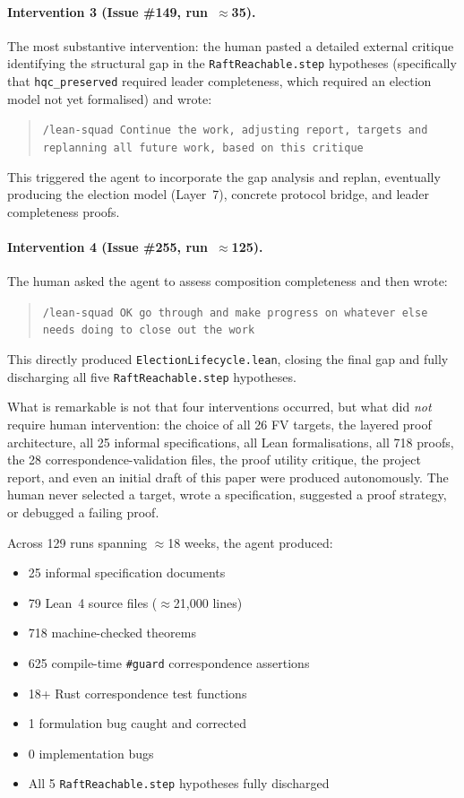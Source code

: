 \documentclass[sigconf,10pt]{acmart}
\begin{document}
\paragraph{Intervention 3 (Issue \#149, run~$\approx$35).}
The most substantive intervention: the human pasted a detailed
external critique identifying the structural gap in the
\texttt{RaftReachable.step} hypotheses (specifically that
\texttt{hqc\_preserved} required leader completeness, which
required an election model not yet formalised) and wrote:
\begin{quote}\small
\texttt{/lean-squad Continue the work, adjusting report, targets
and replanning all future work, based on this critique}
\end{quote}
This triggered the agent to incorporate the gap analysis and
replan, eventually producing the election model (Layer~7),
concrete protocol bridge, and leader completeness proofs.

\paragraph{Intervention 4 (Issue \#255, run~$\approx$125).}
The human asked the agent to assess composition completeness
and then wrote:
\begin{quote}\small
\texttt{/lean-squad OK go through and make progress on whatever
else needs doing to close out the work}
\end{quote}
This directly produced \texttt{ElectionLifecycle.lean},
closing the final gap and fully discharging all
five \texttt{RaftReachable.step} hypotheses.

What is remarkable is not that four interventions occurred,
but what did \emph{not} require human intervention: the choice of all
26 FV targets, the layered proof architecture, all 25 informal
specifications, all Lean formalisations, all 718 proofs, the 28
correspondence-validation files, the proof utility critique, the project
report, and even an initial draft of this paper were produced autonomously.
The human never selected a target, wrote a specification, suggested a
proof strategy, or debugged a failing proof.

Across 129 runs spanning $\approx$18 weeks, the agent produced:
\begin{itemize}\setlength\itemsep{0pt}
  \item 25 informal specification documents
  \item 79 Lean~4 source files ($\approx$21{,}000 lines)
  \item 718 machine-checked theorems
  \item 625 compile-time \texttt{\#guard} correspondence assertions
  \item 18+ Rust correspondence test functions
  \item 1 formulation bug caught and corrected
  \item 0 implementation bugs
  \item All 5 \texttt{RaftReachable.step} hypotheses fully discharged
\end{itemize}
\end{document}

